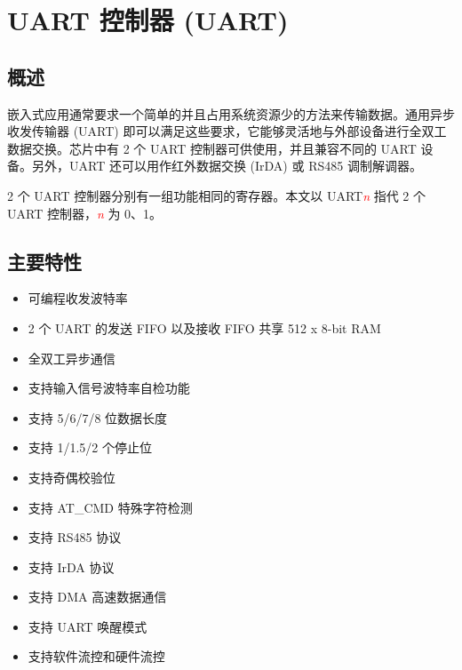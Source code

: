 \documentclass[main\_\_CN.tex]{subfiles}
\begin{document}

\ifglobal
\else
    {\let\clearpage\relax \listoftodos}
    {\let\clearpage\relax \listofdonetodos}
    \tableofcontents
\fi



\hypertarget{uart}{}
\chapter{UART 控制器 (UART)}
\label{mod:uart}

\section{概述}

嵌入式应用通常要求一个简单的并且占用系统资源少的方法来传输数据。通用异步收发传输器 (UART) 即可以满足这些要求，它能够灵活地与外部设备进行全双工数据交换。芯片中有 2 个 UART 控制器可供使用，并且兼容不同的 UART 设备。另外，UART 还可以用作红外数据交换 (IrDA) 或 RS485 调制解调器。

2 个 UART 控制器分别有一组功能相同的寄存器。本文以 UART\textcolor{red}{\it{n}} 指代 2 个 UART 控制器，\textcolor{red}{\it{n}} 为 0、1。

\section{主要特性}

\begin{itemize}
    \item 可编程收发波特率
    \item 2 个 UART 的发送 FIFO 以及接收 FIFO 共享 512 x 8-bit RAM
    \item 全双工异步通信
    \item 支持输入信号波特率自检功能
    \item 支持 5/6/7/8 位数据长度
    \item 支持 1/1.5/2 个停止位
    \item 支持奇偶校验位
    \item 支持 AT\_CMD 特殊字符检测
    \item 支持 RS485 协议
    \item 支持 IrDA 协议
    \item 支持 DMA 高速数据通信
    \item 支持 UART 唤醒模式
    \item 支持软件流控和硬件流控
\end{itemize}
\end{document}
